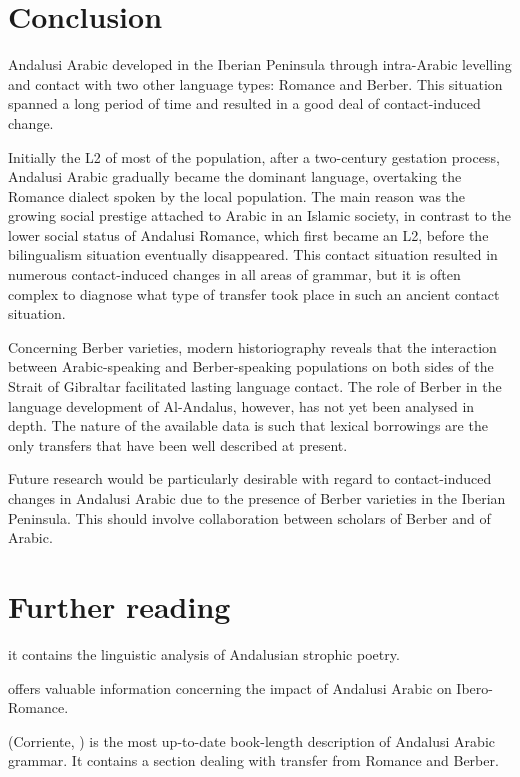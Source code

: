 \documentclass[output=paper,modfonts,nonflat]{langsci/langscibook}
\begin{document}
\section{Conclusion}


Andalusi Arabic developed in the Iberian Peninsula through intra-Arabic levelling and contact with two other language types: Romance and Berber. This situation spanned a long period of time and resulted in a good deal of contact-induced change. 

Initially the L2 of most of the population, after a two-century gestation process, Andalusi Arabic gradually became the dominant language, overtaking the Romance dialect spoken by the local population. The main reason was the growing social prestige attached to Arabic in an Islamic society, in contrast to the lower social status of Andalusi Romance, which first became an L2, before the bilingualism situation eventually disappeared. This contact situation resulted in numerous contact-induced changes in all areas of grammar, but it is often complex to diagnose what type of transfer took place in such an ancient contact situation. 

Concerning Berber varieties, modern historiography reveals that the interaction between Arabic-speaking and Berber-speaking populations on both sides of the Strait of Gibraltar facilitated lasting language contact. The role of Berber in the language development of Al-Andalus, however, has not yet been analysed in depth. The nature of the available data is such that lexical borrowings are the only transfers that have been well described at present. 

Future research would be particularly desirable with regard to contact-induced changes in Andalusi Arabic due to the presence of Berber varieties in the Iberian Peninsula. This should involve collaboration between scholars of Berber and of Arabic. 

\section*{Further reading}

\citep{Corriente1997a} it{ contains the linguistic analysis of Andalusian strophic poetry.}

 \citep{Corriente2005} offers valuable information concerning the impact of Andalusi Arabic on Ibero-Romance. 

(Corriente, \citealt{PereiraVicente2015}) is the most up-to-date book-length description of Andalusi Arabic grammar. It contains a section dealing with transfer from Romance and Berber. 
\end{document}
